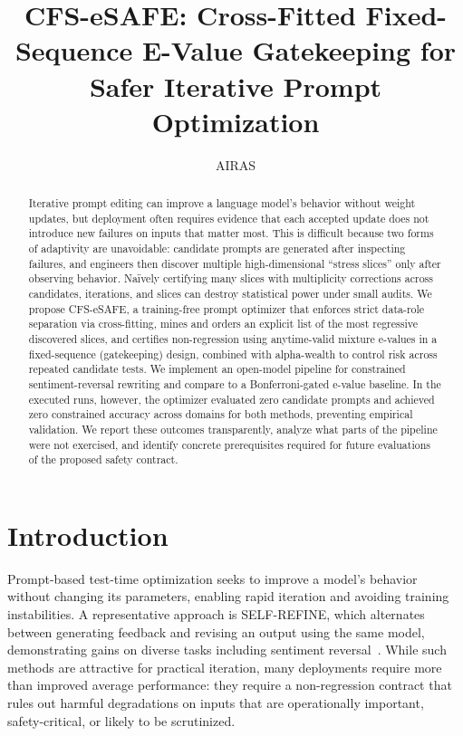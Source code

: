 \documentclass{article} %
\title{CFS-eSAFE\@: Cross-Fitted Fixed-Sequence E-Value Gatekeeping for Safer Iterative Prompt Optimization}
\author{AIRAS}
\begin{document}
\maketitle

\begin{abstract}
Iterative prompt editing can improve a language model’s behavior without weight updates, but deployment often requires evidence that each accepted update does not introduce new failures on inputs that matter most. This is difficult because two forms of adaptivity are unavoidable: candidate prompts are generated after inspecting failures, and engineers then discover multiple high-dimensional “stress slices” only after observing behavior. Naïvely certifying many slices with multiplicity corrections across candidates, iterations, and slices can destroy statistical power under small audits. We propose CFS-eSAFE, a training-free prompt optimizer that enforces strict data-role separation via cross-fitting, mines and orders an explicit list of the most regressive discovered slices, and certifies non-regression using anytime-valid mixture e-values in a fixed-sequence (gatekeeping) design, combined with alpha-wealth to control risk across repeated candidate tests. We implement an open-model pipeline for constrained sentiment-reversal rewriting and compare to a Bonferroni-gated e-value baseline. In the executed runs, however, the optimizer evaluated zero candidate prompts and achieved zero constrained accuracy across domains for both methods, preventing empirical validation. We report these outcomes transparently, analyze what parts of the pipeline were not exercised, and identify concrete prerequisites required for future evaluations of the proposed safety contract.
\end{abstract}

\section{Introduction}\label{sec:intro}
Prompt-based test-time optimization seeks to improve a model’s behavior without changing its parameters, enabling rapid iteration and avoiding training instabilities. A representative approach is SELF-REFINE, which alternates between generating feedback and revising an output using the same model, demonstrating gains on diverse tasks including sentiment reversal~\cite{madaan-2023-self}. While such methods are attractive for practical iteration, many deployments require more than improved average performance: they require a non-regression contract that rules out harmful degradations on inputs that are operationally important, safety-critical, or likely to be scrutinized.
\end{document}
